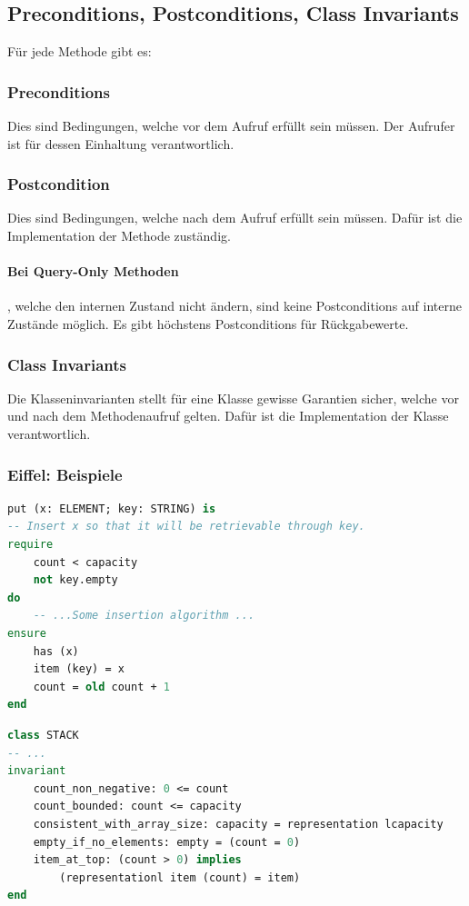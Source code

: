 \subsection{Preconditions, Postconditions, Class Invariants}

Für jede Methode gibt es:

\subsubsection{Preconditions}

Dies sind Bedingungen, welche vor dem Aufruf erfüllt sein müssen. Der Aufrufer ist für dessen Einhaltung verantwortlich.

\subsubsection{Postcondition}
Dies sind Bedingungen, welche nach dem Aufruf erfüllt sein müssen. Dafür ist die Implementation der Methode zuständig.

\paragraph{Bei Query-Only Methoden}, welche den internen Zustand nicht ändern, sind keine Postconditions auf interne Zustände möglich. Es gibt höchstens Postconditions für Rückgabewerte.


\subsubsection{Class Invariants}

Die Klasseninvarianten stellt für eine Klasse gewisse Garantien sicher, welche vor und nach dem Methodenaufruf gelten. Dafür ist die Implementation der Klasse verantwortlich.


\subsubsection{Eiffel: Beispiele}

\begin{lstlisting}[language=eiffel]
put (x: ELEMENT; key: STRING) is
-- Insert x so that it will be retrievable through key.
require
	count < capacity
	not key.empty
do
	-- ...Some insertion algorithm ...
ensure
	has (x)
	item (key) = x
	count = old count + 1
end
\end{lstlisting}

\begin{lstlisting}[language=eiffel]
class STACK
-- ...
invariant
	count_non_negative: 0 <= count
	count_bounded: count <= capacity
	consistent_with_array_size: capacity = representation lcapacity
	empty_if_no_elements: empty = (count = 0)
	item_at_top: (count > 0) implies
		(representationl item (count) = item)
end
\end{lstlisting}


